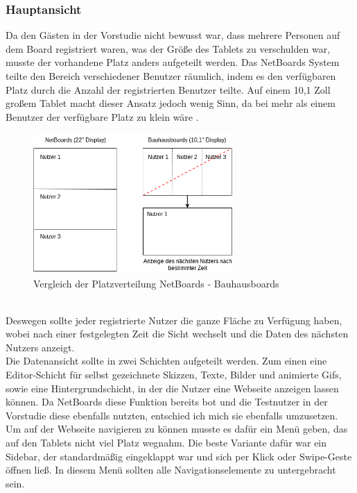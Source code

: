 \subsubsection{Hauptansicht}\label{Hauptansicht}
Da den Gästen in der Vorstudie nicht bewusst war, dass mehrere Personen auf dem Board registriert waren, was der Größe des Tablets zu verschulden war, musste der vorhandene Platz anders aufgeteilt werden. Das NetBoards System teilte den Bereich verschiedener Benutzer räumlich, indem es den verfügbaren Platz durch die Anzahl der registrierten Benutzer teilte.
Auf einem 10,1 Zoll großem Tablet macht dieser Ansatz jedoch wenig Sinn, da bei mehr als einem Benutzer der verfügbare Platz zu klein wäre .
\begin{figure}[h!]
  \centering
    \includegraphics[width=0.68\textwidth]{./img/AufteilungMainView.png}
  \caption{Vergleich der Platzverteilung NetBoards - Bauhausboards}
  \label{img:aufteilungMainView}
\end{figure}
\\
Deswegen sollte jeder registrierte Nutzer die ganze Fläche zu Verfügung haben, wobei nach einer festgelegten Zeit die Sicht wechselt und die Daten des nächsten Nutzers anzeigt.
\\
Die Datenansicht sollte in zwei Schichten aufgeteilt werden. Zum einen eine Editor-Schicht für selbst gezeichnete Skizzen, Texte, Bilder und animierte Gifs, sowie eine Hintergrundschicht, in der die Nutzer eine Webseite anzeigen lassen können. Da NetBoards diese Funktion bereits bot und die Testnutzer in der Vorstudie diese ebenfalls nutzten, entschied ich mich sie ebenfalls umzusetzen.
\\
Um auf der Webseite navigieren zu können musste es dafür ein Menü geben, das auf den Tablets nicht viel Platz wegnahm. Die beste Variante dafür war ein Sidebar, der standardmäßig eingeklappt war und sich per Klick oder Swipe-Geste öffnen ließ.
In diesem Menü sollten alle Navigationselemente zu untergebracht sein. 
